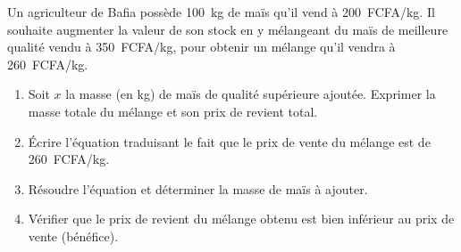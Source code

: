 \documentclass[11pt]{article}
\begin{document}
\begin{exercice}
Un agriculteur de Bafia possède \SI{100}{kg} de maïs qu'il vend à \SI{200}{FCFA/kg}. Il souhaite augmenter la valeur de son stock en y mélangeant du maïs de meilleure qualité vendu à \SI{350}{FCFA/kg}, pour obtenir un mélange qu'il vendra à \SI{260}{FCFA/kg}.
\begin{enumerate}
    \item Soit $x$ la masse (en kg) de maïs de qualité supérieure ajoutée. Exprimer la masse totale du mélange et son prix de revient total.
    \item Écrire l'équation traduisant le fait que le prix de vente du mélange est de \SI{260}{FCFA/kg}.
    \item Résoudre l'équation et déterminer la masse de maïs à ajouter.
    \item Vérifier que le prix de revient du mélange obtenu est bien inférieur au prix de vente (bénéfice).
\end{enumerate}
\end{exercice}
\end{document}

